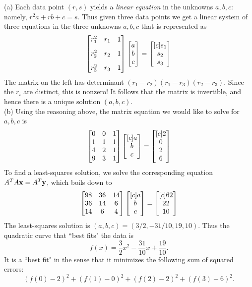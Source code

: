 \begin{solution}
\noindent
(a) Each data point $(r,s)$ yields a {\em linear equation} in the unknowns $a,b,c$: namely, $r^2a+rb+c=s$. Thus given three data points we get a linear system of three equations in the three unknowns $a,b,c$ that is represented as 
\[
\begin{bmatrix}
r_1^2&r_1&1\\[2ex]
r_2^2&r_2&1\\[2ex]
r_3^2&r_3&1
\end{bmatrix}
\begin{bmatrix}
a\\ b\\ c
\end{bmatrix}  
=\begin{bmatrix}[c] s_1\\s_2 \\s_3 \end{bmatrix}
\]
The matrix on the left has determinant $(r_1-r_2)(r_1-r_3)(r_2-r_3)$. Since the $r_i$ are distinct, this is nonzero! It follows that the matrix is invertible, and hence there is a unique solution $(a,b,c)$. 
\\
(b) Using the reasoning above, the matrix equation we would like to solve for $a,b,c$ is 
\[
\begin{bmatrix}
0&0&1\\
1&1&1\\
4&2&1\\
9&3&1
\end{bmatrix} 
\begin{bmatrix}[c] a\\ b\\ c \end{bmatrix}
=\begin{bmatrix}[c] 2\\ 0\\ 2\\ 6 \end{bmatrix}
\]
To find a least-squares solution, we solve the corresponding equation $A^TA{\mathbf x}=A^T{\mathbf y}$, which boils down to 
\[
\begin{bmatrix}
98&36&14\\
36&14&6\\
14&6&4
\end{bmatrix} 
\begin{bmatrix}[c] a\\ b\\ c \end{bmatrix}
=
\begin{bmatrix}[c] 62\\ 22\\ 10 \end{bmatrix}
\]
The least-squares solution is $(a,b,c)=(3/2,-31/10, 19,10)$. Thus the quadratic curve that ``best fits" the data is 
\[
f(x)=\frac{3}{2}x^2-\frac{31}{10}x+\frac{19}{10}.
\]
It is a ``best fit" in the sense that it minimizes the following sum of squared errors: 
\[
(f(0)-2)^2+(f(1)-0)^2+(f(2)-2)^2+(f(3)-6)^2.
\]
\end{solution}
